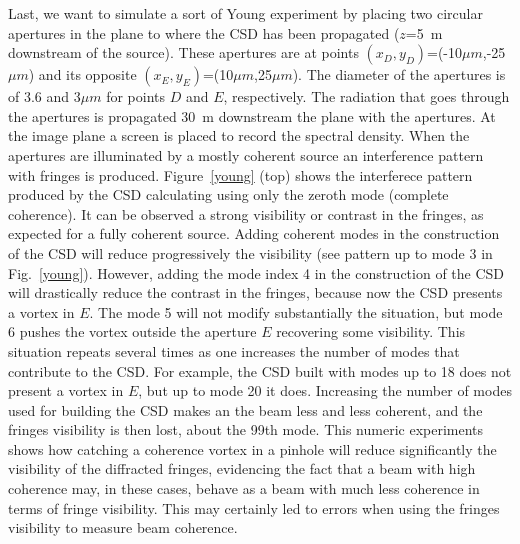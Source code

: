 \documentclass{iucr}              %
\newcommand{\inblue}[1]{{\color{blue}#1}}
\begin{document}
Last, we want to simulate a sort of Young experiment by placing two circular apertures in the plane to where the CSD has been propagated ($z$=5~m downstream of the source). These apertures are at points $(x_D,y_D)$=(-10$\mu m$,-25$\mu m$) and its opposite $(x_E,y_E)$=(10$\mu m$,25$\mu m$). The diameter of the apertures is of 3.6 and 3$\mu m$ for points $D$ and $E$, respectively. The radiation that goes through the apertures is propagated 30~m downstream the plane with the apertures. At the image plane a screen is placed to record the spectral density. When the apertures are illuminated by a mostly coherent source an interference pattern with fringes is produced. \inblue{Figure~\ref{young} (top)}  shows the interferece pattern produced by the CSD calculating using only the zeroth mode (complete coherence). It can be observed a strong visibility or contrast in the fringes, as expected for a  fully coherent source. Adding coherent modes in the construction of the CSD will reduce progressively the visibility (see pattern up to mode 3 in \inblue{Fig.~\ref{young}}). However, adding the mode index 4 in the construction of the CSD will drastically reduce the contrast in the fringes, because now the CSD presents a vortex in $E$. The mode 5 will not modify substantially the situation, but mode 6 pushes the vortex outside the aperture $E$ recovering some visibility. This situation repeats several times as one increases the number of modes that contribute to the CSD. For example, the CSD built with modes up to 18 does not present a vortex in $E$, but up to mode 20 it does. Increasing the number of modes used for building the CSD makes an the beam less and less coherent, and the fringes visibility is then lost, about the 99th mode. This numeric experiments shows how catching a coherence vortex in a pinhole will reduce significantly the visibility of the diffracted fringes, evidencing the fact that a beam with high coherence may, in these cases, behave as a beam with much less coherence in terms of fringe visibility. This may certainly led to errors when using the fringes visibility to measure beam coherence.  
\end{document}
